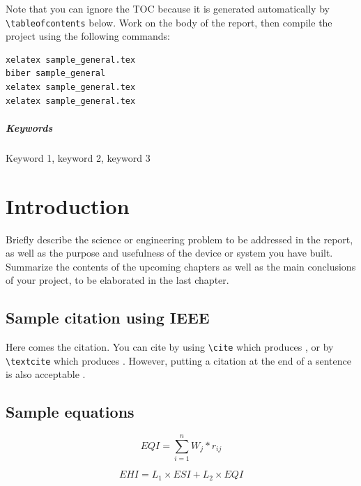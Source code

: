 \documentclass{senior-design}
\begin{document}
Note that you can ignore the TOC because it is generated automatically by \verb|\tableofcontents| below. Work on the body of the report, then compile the project using the following commands:
\begin{lstlisting}
xelatex sample_general.tex
biber sample_general
xelatex sample_general.tex
xelatex sample_general.tex
\end{lstlisting}

\paragraph{Keywords}
Keyword 1, keyword 2, keyword 3

\tableofcontents\thispagestyle{toc}

\mainmatter
\chapter{Introduction}
Briefly describe the science or engineering problem to be addressed in the report, as well as the purpose and usefulness of the device or system you have built. Summarize the contents of the upcoming chapters as well as the main conclusions of your project, to be elaborated in the last chapter.

\section{Sample citation using IEEE}
Here comes the citation. You can cite by using \verb|\cite| which produces \cite{book1,paper1}, or by \verb|\textcite| which produces \textcite{book2}. However, putting a citation at the end of a sentence is also acceptable \cite{webpage1}.

\section{Sample equations}
\begin{equation}
    EQI = \sum_{i=1}^{n}W_j * r_{ij}
\end{equation}

\begin{equation}
    EHI = L_1 \times ESI + L_2 \times EQI
\end{equation}
\end{document}
